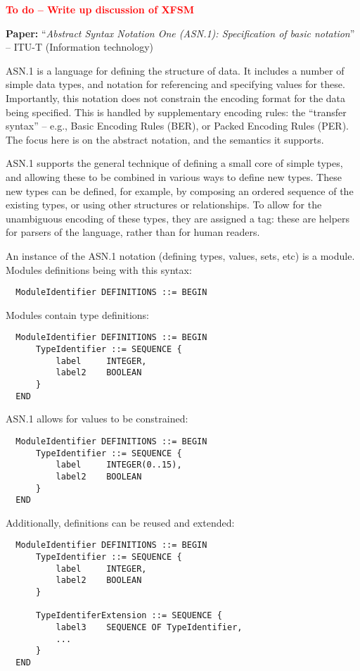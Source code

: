 \documentclass[10pt,a4paper]{article}
\newcommand{\todo}[1]{\textbf{\textcolor{red}{To do -- #1}}}
\newcommand{\paper}[3]{\vspace{4mm}\noindent\textbf{Paper:} ``\textit{#1}'' -- #2 \cite{#3}\vspace{3mm}}
\begin{document}
\todo{Write up discussion of XFSM}

\paper{Abstract Syntax Notation One (ASN.1): Specification of basic notation}{ITU-T (Information technology)}{x680}

ASN.1 is a language for defining the structure of data. It includes a number of simple
data types, and notation for referencing and specifying values for these. Importantly,
this notation does not constrain the encoding format for the data being specified. This
is handled by supplementary encoding rules: the ``transfer syntax'' -- e.g., Basic
Encoding Rules (BER), or Packed Encoding Rules (PER). The focus here is on the abstract
notation, and the semantics it supports.

ASN.1 supports the general technique of defining a small core of simple types, and
allowing these to be combined in various ways to define new types. These new types can
be defined, for example, by composing an ordered sequence of the existing types, or using
other structures or relationships. To allow for the unambiguous encoding of these types,
they are assigned a tag: these are helpers for parsers of the language, rather than for
human readers.

An instance of the ASN.1 notation (defining types, values, sets, etc) is a
module. Modules definitions being with this syntax:

\begin{verbatim}
  ModuleIdentifier DEFINITIONS ::= BEGIN
\end{verbatim}

Modules contain type definitions:

\begin{verbatim}
  ModuleIdentifier DEFINITIONS ::= BEGIN
      TypeIdentifier ::= SEQUENCE {
          label     INTEGER,
          label2    BOOLEAN
      }
  END
\end{verbatim}

ASN.1 allows for values to be constrained:

\begin{verbatim}
  ModuleIdentifier DEFINITIONS ::= BEGIN
      TypeIdentifier ::= SEQUENCE {
          label     INTEGER(0..15),
          label2    BOOLEAN
      }
  END  
\end{verbatim}

Additionally, definitions can be reused and extended:

\begin{verbatim}
  ModuleIdentifier DEFINITIONS ::= BEGIN
      TypeIdentifier ::= SEQUENCE {
          label     INTEGER,
          label2    BOOLEAN
      }
    
      TypeIdentiferExtension ::= SEQUENCE {
          label3    SEQUENCE OF TypeIdentifier,
          ...
      }
  END
\end{verbatim}
\end{document}
